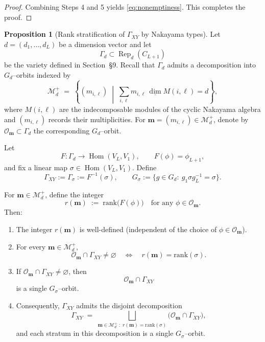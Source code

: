 \documentclass{article}
\newcommand{\Hom}{\operatorname{Hom}}
\newcommand{\Rep}{\operatorname{Rep}}
\theoremstyle{definition}
\newtheorem{proposition}[theorem]{Proposition}
\begin{document}
\begin{proof}
Combining Steps 4 and 5 yields \eqref{eq:nonemptiness}. This completes the proof.
\end{proof}
\begin{proposition}[Rank stratification of $\Gamma_{XY}$ by Nakayama types]
\label{prop:GammaXY_orbit_decomposition}
Let $d=(d_1,\dots,d_L)$ be a dimension vector and let
\[
\Gamma_d \subset \Rep_d(C_{L+1})
\]
be the variety defined in Section~\S9.
Recall that $\Gamma_d$ admits a decomposition into $G_d$--orbits indexed by
\[
\mathcal M_d^+ \;=\; \left\{ (m_{i,\ell}) \;\middle|\; 
\sum_{i,\ell} m_{i,\ell}\,\underline{\dim} M(i,\ell)=d
\right\},
\]
where $M(i,\ell)$ are the indecomposable modules of the cyclic Nakayama algebra
and $(m_{i,\ell})$ records their multiplicities.
For $\mathbf m=(m_{i,\ell})\in\mathcal M_d^+$, denote by
$\mathcal O_{\mathbf m}\subset\Gamma_d$ the corresponding $G_d$--orbit.

Let
\[
F:\Gamma_d\longrightarrow \Hom(V_L,V_1),
\qquad
F(\phi)=\phi_{L+1},
\]
and fix a linear map $\sigma\in\Hom(V_L,V_1)$.
Define
\[
\Gamma_{XY}:=\Gamma_\sigma:=F^{-1}(\sigma),
\qquad
G_\sigma:=\{g\in G_d:\ g_1\sigma g_L^{-1}=\sigma\}.
\]

For $\mathbf m\in\mathcal M_d^+$, define the integer
\[
r(\mathbf m)\;:=\;\mathrm{rank}\big(F(\phi)\big)
\quad\text{for any }\phi\in\mathcal O_{\mathbf m}.
\]
Then:

\begin{enumerate}
\item[(i)] The integer $r(\mathbf m)$ is well-defined (independent of the choice of
$\phi\in\mathcal O_{\mathbf m}$).

\item[(ii)] For every $\mathbf m\in\mathcal M_d^+$,
\[
\mathcal O_{\mathbf m}\cap \Gamma_{XY}\neq\varnothing
\quad\Longleftrightarrow\quad
r(\mathbf m)=\mathrm{rank}(\sigma).
\]

\item[(iii)] If $\mathcal O_{\mathbf m}\cap \Gamma_{XY}\neq\varnothing$, then
\[
\mathcal O_{\mathbf m}\cap \Gamma_{XY}
\]
is a single $G_\sigma$--orbit.

\item[(iv)] Consequently, $\Gamma_{XY}$ admits the disjoint decomposition
\[
\Gamma_{XY}
\;=\;
\bigsqcup_{\mathbf m\in\mathcal M_d^+ \;:\; r(\mathbf m)=\mathrm{rank}(\sigma)}
\big(\mathcal O_{\mathbf m}\cap \Gamma_{XY}\big),
\]
and each stratum in this decomposition is a single $G_\sigma$--orbit.
\end{enumerate}
\end{proposition}
\end{document}
